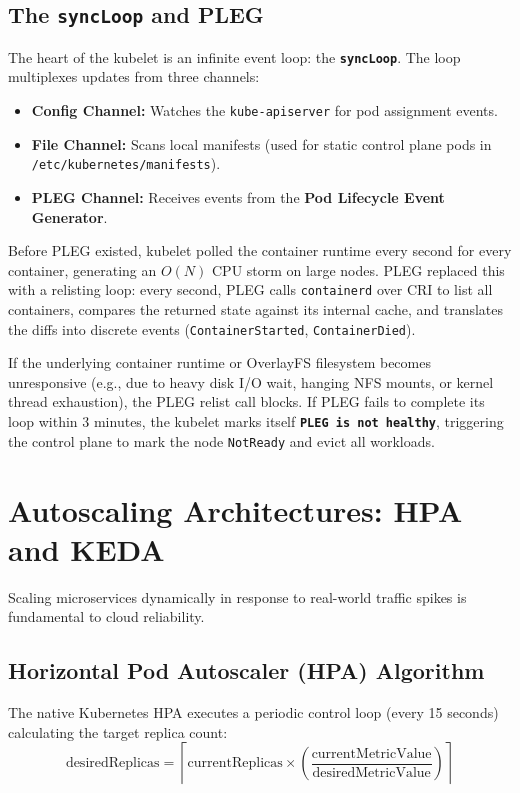 \subsection{The \texttt{syncLoop} and PLEG}
The heart of the kubelet is an infinite event loop: the \textbf{\texttt{syncLoop}}. The loop multiplexes updates from three channels:
\begin{itemize}[leftmargin=12pt]
  \item \textbf{Config Channel:} Watches the \texttt{kube-apiserver} for pod assignment events.
  \item \textbf{File Channel:} Scans local manifests (used for static control plane pods in \texttt{/etc/kubernetes/manifests}).
  \item \textbf{PLEG Channel:} Receives events from the \textbf{Pod Lifecycle Event Generator}.
\end{itemize}

\begin{underthehoodbox}
Before PLEG existed, kubelet polled the container runtime every second for every container, generating an $O(N)$ CPU storm on large nodes. PLEG replaced this with a relisting loop: every second, PLEG calls \texttt{containerd} over CRI to list all containers, compares the returned state against its internal cache, and translates the diffs into discrete events (\texttt{ContainerStarted}, \texttt{ContainerDied}). 

If the underlying container runtime or OverlayFS filesystem becomes unresponsive (e.g., due to heavy disk I/O wait, hanging NFS mounts, or kernel thread exhaustion), the PLEG relist call blocks. If PLEG fails to complete its loop within 3 minutes, the kubelet marks itself \textbf{\texttt{PLEG is not healthy}}, triggering the control plane to mark the node \texttt{NotReady} and evict all workloads.
\end{underthehoodbox}

\section{Autoscaling Architectures: HPA and KEDA}

Scaling microservices dynamically in response to real-world traffic spikes is fundamental to cloud reliability.

\subsection{Horizontal Pod Autoscaler (HPA) Algorithm}
The native Kubernetes HPA executes a periodic control loop (every 15 seconds) calculating the target replica count:
\begin{equation}
\text{desiredReplicas} = \left\lceil \text{currentReplicas} \times \left( \frac{\text{currentMetricValue}}{\text{desiredMetricValue}} \right) \right\rceil
\end{equation}

